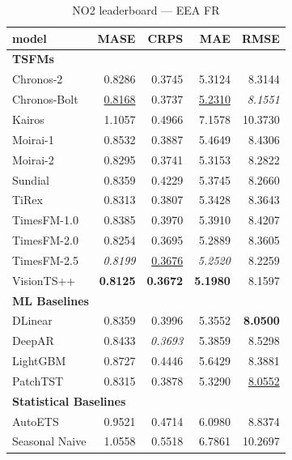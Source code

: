 \begin{table}[H]
\caption{NO2 leaderboard --- EEA FR}
\centering
\begin{small}
\begin{tabular}{lrrrr}
\toprule
model & MASE & CRPS & MAE & RMSE \\
\midrule
\multicolumn{5}{l}{\textbf{TSFMs}} \\
Chronos-2 & 0.8286 & 0.3745 & 5.3124 & 8.3144 \\
Chronos-Bolt & \underline{0.8168} & 0.3737 & \underline{5.2310} & \textit{8.1551} \\
Kairos & 1.1057 & 0.4966 & 7.1578 & 10.3730 \\
Moirai-1 & 0.8532 & 0.3887 & 5.4649 & 8.4306 \\
Moirai-2 & 0.8295 & 0.3741 & 5.3153 & 8.2822 \\
Sundial & 0.8359 & 0.4229 & 5.3745 & 8.2660 \\
TiRex & 0.8313 & 0.3807 & 5.3428 & 8.3643 \\
TimesFM-1.0 & 0.8385 & 0.3970 & 5.3910 & 8.4207 \\
TimesFM-2.0 & 0.8254 & 0.3695 & 5.2889 & 8.3605 \\
TimesFM-2.5 & \textit{0.8199} & \underline{0.3676} & \textit{5.2520} & 8.2259 \\
VisionTS++ & \textbf{0.8125} & \textbf{0.3672} & \textbf{5.1980} & 8.1597 \\
\midrule
\multicolumn{5}{l}{\textbf{ML Baselines}} \\
DLinear & 0.8359 & 0.3996 & 5.3552 & \textbf{8.0500} \\
DeepAR & 0.8433 & \textit{0.3693} & 5.3859 & 8.5298 \\
LightGBM & 0.8727 & 0.4446 & 5.6429 & 8.3881 \\
PatchTST & 0.8315 & 0.3878 & 5.3290 & \underline{8.0552} \\
\midrule
\multicolumn{5}{l}{\textbf{Statistical Baselines}} \\
AutoETS & 0.9521 & 0.4714 & 6.0980 & 8.8374 \\
Seasonal Naive & 1.0558 & 0.5518 & 6.7861 & 10.2697 \\
\bottomrule
\end{tabular}
\end{small}
\end{table}